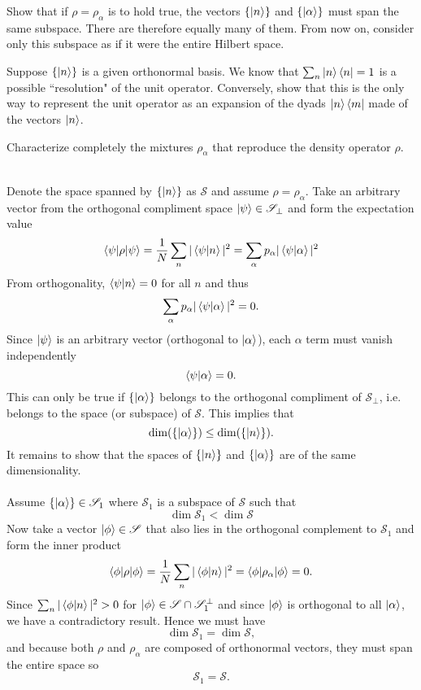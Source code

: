 \documentclass[10pt,letterpaper]{article}
\begin{document}
	\benum
	\item
	Show that if $\rho =\rho_\alpha$ is to hold true, the vectors $\{ \ket n\}$ and $\{ \ket\alpha \}$ must span 
	the same subspace. There are therefore equally many of them. From now on, consider only this subspace as if 
	it were the entire Hilbert space.
	\item
	Suppose $\{ \ket n\}$ is a given orthonormal basis. We know that $\sum_n \ket n \bra n =1$ is a possible
	``resolution" of the unit operator. Conversely, show that this is the only way to represent the unit operator as an 
	expansion of the dyads $\ket n \bra m$ made of the vectors $\ket n$. 
	\item 
	Characterize completely the mixtures $\rho_\alpha$ that reproduce the density operator $\rho$. 
	\\ \\ 
	\eenum
	\benum
	\item
	Denote the space spanned by $\{ \ket n\}$ as $\mathscr S$ and assume $\rho = \rho_\alpha$. Take an arbitrary vector 		from the orthogonal compliment space $\ket \psi \in \mathscr S_\perp$ and form the expectation value
	\[
		\braket{\psi|\rho|\psi} = \frac{1}{N} \sum_n |\braket{\psi|n}|^2 = \sum_\alpha p_\alpha |\braket{\psi|\alpha}|^2
	\]
	From orthogonality, $\braket{\psi|n} = 0$ for all $n$ and thus
	\[
		\sum_\alpha p_\alpha |\braket{\psi|\alpha}|^2 = 0.
	\]
	Since $\ket \psi$ is an arbitrary vector (orthogonal to $\ket\alpha$), each $\alpha$ term must vanish independently
	\[
		\braket{\psi|\alpha} = 0.
	\]
	This can only be true if $\{ \ket\alpha \}$ belongs to the orthogonal compliment of $\mathscr S_\perp$, i.e. belongs
	to the space (or subspace) of $\mathscr S$. This implies that 
	\[
		\dim( \{ \ket\alpha \}) \le \dim(\{ \ket n\}).
	\]
	It remains to show that the spaces of $\{ \ket n\}$ and $\{ \ket \alpha \}$ are of the
	same dimensionality.
	\\ \\
	Assume $\{ \ket \alpha \} \in \mathscr S_1$ where $\mathscr S_1$ is a subspace of $\mathscr S$
	such that
	\[
		\dim \mathscr S_1 < \dim \mathscr S
	\]
	Now take a vector $\ket \phi \in \mathscr S$ that also lies in the orthogonal complement to $\mathscr S_1$ and
	form the inner product
	\[
		\braket{\phi|\rho|\phi} = \frac{1}{N} \sum_{n} |\braket{\phi|n}|^2 = \braket{\phi|\rho_\alpha|\phi} = 0.
	\]
	Since $\sum_n |\braket{\phi|n}|^2 > 0$ for $\ket \phi \in \mathscr S \cap \mathscr S_1^\perp$ and since $\ket \phi$ 
	is orthogonal to all $\ket \alpha$, we have a contradictory result. 
	Hence we must have
	\[
		\dim \mathscr S_1 = \dim \mathscr S,
	\]
	and because both $\rho$ and $\rho_\alpha$ are composed of orthonormal vectors, they must span the entire space
	so
	\[
		\mathscr S_1 = \mathscr S.
	\]
	\\ \\
	
\end{document}
